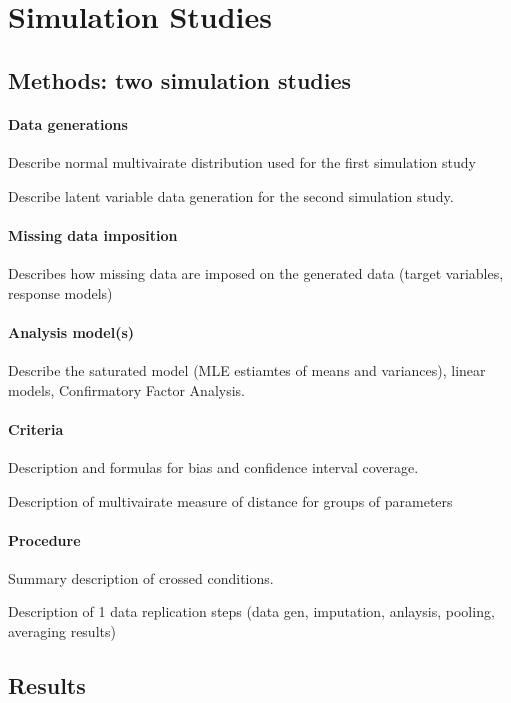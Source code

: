 \maketitle
\section{Simulation Studies}

\subsection{Methods: two simulation studies}

\paragraph{Data generations}
	Describe normal multivairate distribution used for the first simulation study 

	Describe latent variable data generation for the second simulation study.

\paragraph{Missing data imposition}
	Describes how missing data are imposed on the generated data (target variables, response models)

\paragraph{Analysis model(s)}
	Describe the saturated model (MLE estiamtes of means and variances), linear models, 
	Confirmatory Factor Analysis.

\paragraph{Criteria}
	Description and formulas for bias and confidence interval coverage.

	Description of multivairate measure of distance for groups of parameters

\paragraph{Procedure}
	Summary description of crossed conditions.

	Description of 1 data replication steps (data gen, imputation, anlaysis, pooling, averaging results)

\subsection{Results}

